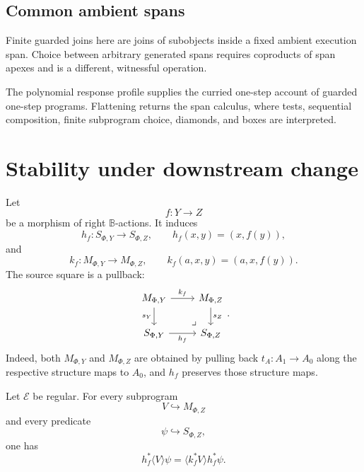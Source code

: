 \subsection{Common ambient spans}
\label{subsec:poly-relative-common-ambient-spans}

\begin{remark}
\label{rem:poly-relative-common-ambient-spans}
Finite guarded joins here are joins of subobjects inside a fixed ambient
execution span.  Choice between arbitrary generated spans requires coproducts
of span apexes and is a different, witnessful operation.
\end{remark}

\begin{remark}
\label{rem:poly-relative-program-algebra-from-polynomial}
The polynomial response profile supplies the curried one-step account of
guarded one-step programs.  Flattening returns the span calculus, where tests,
sequential composition, finite subprogram choice, diamonds, and boxes are
interpreted.
\end{remark}


\section{Stability under downstream change}
\label{subsec:relative-modal-stability-downstream}

Let
\[
f:Y\to Z
\]
be a morphism of right \(\mathbb B\)-actions. It induces
\[
h_f:S_{\Phi,Y}\to S_{\Phi,Z},
\qquad
h_f(x,y)=(x,f(y)),
\]
and
\[
k_f:M_{\Phi,Y}\to M_{\Phi,Z},
\qquad
k_f(a,x,y)=(a,x,f(y)).
\]
The source square is a pullback:
\[
\begin{tikzcd}
M_{\Phi,Y} \arrow[r,"k_f"] \arrow[d,"s_Y"']
&
M_{\Phi,Z} \arrow[d,"s_Z"]
\\
S_{\Phi,Y} \arrow[r,"h_f"']
&
S_{\Phi,Z}
\arrow[ul,phantom,very near start,"\lrcorner"]
\end{tikzcd}
.
\]
Indeed, both \(M_{\Phi,Y}\) and \(M_{\Phi,Z}\) are obtained by pulling back
\(t_A:A_1\to A_0\) along the respective structure maps to \(A_0\), and
\(h_f\) preserves those structure maps.

\begin{proposition}
\label{prop:relative-diamond-stability-downstream}
Let \(\mathcal E\) be regular. For every subprogram
\[
V\hookrightarrow M_{\Phi,Z}
\]
and every predicate
\[
\psi\hookrightarrow S_{\Phi,Z},
\]
one has
\[
h_f^\ast\langle V\rangle\psi
=
\langle k_f^\ast V\rangle h_f^\ast\psi.
\]
\end{proposition}

